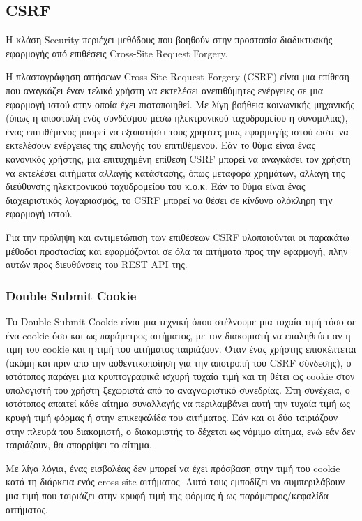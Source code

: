 \subsection{CSRF}
Η κλάση Security περιέχει μεθόδους που βοηθούν στην προστασία διαδικτυακής εφαρμογής από επιθέσεις Cross-Site Request Forgery.

Η πλαστογράφηση αιτήσεων Cross-Site Request Forgery (CSRF) είναι μια επίθεση που αναγκάζει έναν τελικό χρήστη να εκτελέσει ανεπιθύμητες ενέργειες σε μια εφαρμογή ιστού στην οποία έχει πιστοποιηθεί. Με λίγη βοήθεια κοινωνικής μηχανικής (όπως η αποστολή ενός συνδέσμου μέσω ηλεκτρονικού ταχυδρομείου ή συνομιλίας), ένας επιτιθέμενος μπορεί να εξαπατήσει τους χρήστες μιας εφαρμογής ιστού ώστε να εκτελέσουν ενέργειες της επιλογής του επιτιθέμενου. Εάν το θύμα είναι ένας κανονικός χρήστης, μια επιτυχημένη επίθεση CSRF μπορεί να αναγκάσει τον χρήστη να εκτελέσει αιτήματα αλλαγής κατάστασης, όπως μεταφορά χρημάτων, αλλαγή της διεύθυνσης ηλεκτρονικού ταχυδρομείου του κ.ο.κ. Εάν το θύμα είναι ένας διαχειριστικός λογαριασμός, το CSRF μπορεί να θέσει σε κίνδυνο ολόκληρη την εφαρμογή ιστού.

Για την πρόληψη και αντιμετώπιση των επιθέσεων CSRF υλοποιούνται οι παρακάτω μέθοδοι προστασίας και εφαρμόζονται σε όλα τα αιτήματα προς την εφαρμογή, πλην αυτών προς διευθύνσεις του REST API της.

\subsubsection{Double Submit Cookie}
Το Double Submit Cookie είναι μια τεχνική όπου στέλνουμε μια τυχαία τιμή τόσο σε ένα cookie όσο και ως παράμετρος αιτήματος, με τον διακομιστή να επαληθεύει αν η τιμή του cookie και η τιμή του αιτήματος ταιριάζουν. Όταν ένας χρήστης επισκέπτεται (ακόμη και πριν από την αυθεντικοποίηση για την αποτροπή του CSRF σύνδεσης), ο ιστότοπος παράγει μια κρυπτογραφικά ισχυρή τυχαία τιμή και τη θέτει ως cookie στον υπολογιστή του χρήστη ξεχωριστά από το αναγνωριστικό συνεδρίας. Στη συνέχεια, ο ιστότοπος απαιτεί κάθε αίτημα συναλλαγής να περιλαμβάνει αυτή την τυχαία τιμή ως κρυφή τιμή φόρμας ή στην επικεφαλίδα του αιτήματος. Εάν και οι δύο ταιριάζουν στην πλευρά του διακομιστή, ο διακομιστής το δέχεται ως νόμιμο αίτημα, ενώ εάν δεν ταιριάζουν, θα απορρίψει το αίτημα.

Με λίγα λόγια, ένας εισβολέας δεν μπορεί να έχει πρόσβαση στην τιμή του cookie κατά τη διάρκεια ενός cross-site αιτήματος. Αυτό τους εμποδίζει να συμπεριλάβουν μια τιμή που ταιριάζει στην κρυφή τιμή της φόρμας ή ως παράμετρος/κεφαλίδα αιτήματος.

